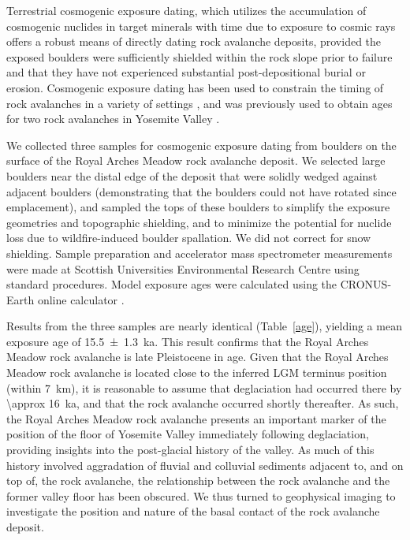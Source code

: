\documentclass[utf8]{frontiersSCNS}
\begin{document}
Terrestrial cosmogenic exposure dating, which utilizes the accumulation of cosmogenic nuclides in target minerals with time due to exposure to cosmic rays \citep[e.g.][]{gosse2001terrestrial} offers a robust means of directly dating rock avalanche deposits, provided the exposed boulders were sufficiently shielded within the rock slope prior to failure and that they have not experienced substantial post-depositional burial or erosion.  Cosmogenic exposure dating has been used to constrain the timing of rock avalanches in a variety of settings \citep[e.g.][]{ballantyne2004beinn, mitchell2007keylong, moreiras2015cosmogenic, nagelisen2015post}, and was previously used to obtain ages for two rock avalanches in Yosemite Valley \citep{stock2010catastrophic, cordes2013supporting}.

We collected three samples for cosmogenic  exposure dating from boulders on the surface of the Royal Arches Meadow rock avalanche deposit.  We selected large boulders near the distal edge of the deposit that were solidly wedged against adjacent boulders (demonstrating that the boulders could not have rotated since emplacement), and sampled the tops of these boulders to simplify the exposure geometries and topographic shielding, and to minimize the potential for nuclide loss due to wildfire-induced boulder spallation. We did not correct for snow shielding. Sample preparation and accelerator mass spectrometer measurements were made at Scottish Universities Environmental Research Centre using standard procedures. Model exposure ages were calculated using the CRONUS-Earth online calculator \citep{phillips2016cronus, marrero2016cosmogenic}.

Results from the three samples are nearly identical (Table~\ref{age}), yielding a mean exposure age of \SI{15.5+-1.3}{\kilo a}.  This result confirms that the Royal Arches Meadow rock avalanche is late Pleistocene in age. Given that the Royal Arches Meadow rock avalanche is located close to the inferred LGM terminus position (within \SI{7}{km}), it is reasonable to assume that deglaciation had occurred there by \SI{\approx 16}{\kilo a}, and that the rock avalanche occurred shortly thereafter.  As such, the Royal Arches Meadow rock avalanche presents an important marker of the position of the floor of Yosemite Valley immediately following deglaciation, providing insights into the post-glacial history of the valley.  As much of this history involved aggradation of fluvial and colluvial sediments adjacent to, and on top of, the rock avalanche, the relationship between the rock avalanche and the former valley floor has been obscured.  We thus turned to geophysical imaging to investigate the position and nature of the basal contact of the rock avalanche deposit.
\end{document}
